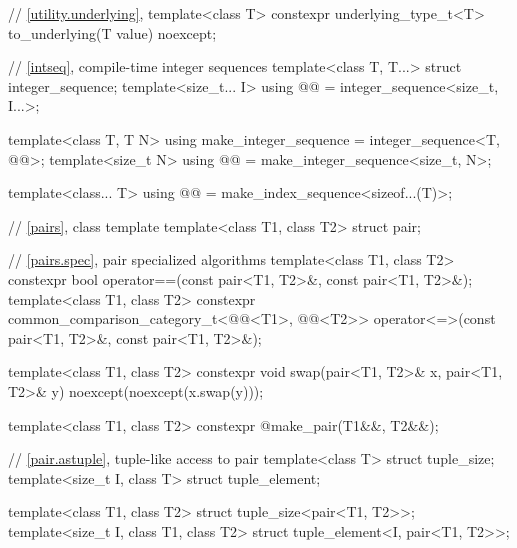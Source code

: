 \begin{codeblock}
{  // \ref{utility.underlying}, 
  template<class T>
    constexpr underlying_type_t<T> to_underlying(T value) noexcept;

  // \ref{intseq}, compile-time integer sequences%
%
%
  template<class T, T...>
    struct integer_sequence;
  template<size_t... I>
    using @@ = integer_sequence<size_t, I...>;

  template<class T, T N>
    using make_integer_sequence = integer_sequence<T, @\seebelow{}@>;
  template<size_t N>
    using @@ = make_integer_sequence<size_t, N>;

  template<class... T>
    using @@ = make_index_sequence<sizeof...(T)>;

  // \ref{pairs}, class template 
  template<class T1, class T2>
    struct pair;

  // \ref{pairs.spec}, pair specialized algorithms
  template<class T1, class T2>
    constexpr bool operator==(const pair<T1, T2>&, const pair<T1, T2>&);
  template<class T1, class T2>
    constexpr common_comparison_category_t<@@<T1>,
                                           @@<T2>>
      operator<=>(const pair<T1, T2>&, const pair<T1, T2>&);

  template<class T1, class T2>
    constexpr void swap(pair<T1, T2>& x, pair<T1, T2>& y) noexcept(noexcept(x.swap(y)));

  template<class T1, class T2>
    constexpr @\seebelow@ make_pair(T1&&, T2&&);

  // \ref{pair.astuple}, tuple-like access to pair
  template<class T> struct tuple_size;
  template<size_t I, class T> struct tuple_element;

  template<class T1, class T2> struct tuple_size<pair<T1, T2>>;
  template<size_t I, class T1, class T2> struct tuple_element<I, pair<T1, T2>>;

}
\end{codeblock}
